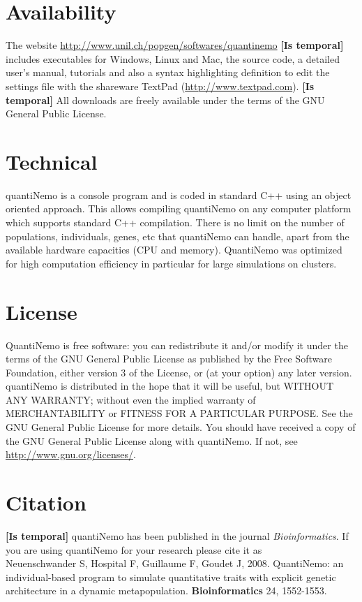 \documentclass[letterpaper,12pt,oneside]{book}
\newcommand{\tbc}[1]{\small {\bf \color{red} [Is temporal]} \normalsize} %
\begin{document}
\section{Availability}
The website \linebreak\url{http://www.unil.ch/popgen/softwares/quantinemo} \tbc{} includes executables for Windows, Linux and Mac, the source code, a detailed user's manual, tutorials and also a syntax highlighting definition to edit the settings file with the shareware TextPad (\linebreak\url{http://www.textpad.com}).  \tbc{} All downloads are freely available under the terms of the GNU General Public License.

\section{Technical}
quantiNemo is a console program and is coded in standard C++ using an object oriented approach. This allows compiling quantiNemo on any computer platform which supports standard C++ compilation. There is no limit on the number of populations, individuals, genes, etc that quantiNemo can handle, apart from the available hardware capacities (CPU and memory). QuantiNemo was optimized for high computation efficiency in particular for large simulations on clusters. 

\section{License}
QuantiNemo is free software: you can redistribute it and/or modify it under the terms of the GNU General Public License as published by the Free Software Foundation, either version 3 of the License, or (at your option) any later version. quantiNemo is distributed in the hope that it will be useful, but WITHOUT ANY WARRANTY; without even the implied warranty of MERCHANTABILITY or FITNESS FOR A PARTICULAR PURPOSE.  See the GNU General Public License for more details. You should have received a copy of the GNU General Public License along with quantiNemo. If not, see \linebreak\url{http://www.gnu.org/licenses/}.

\section{Citation}
\tbc{}
quantiNemo has been published in the journal \textit{Bioinformatics}. If you are using quantiNemo for your research please cite it as \\
 Neuenschwander S, Hospital F, Guillaume F, Goudet J, 2008. QuantiNemo: an individual-based program to simulate quantitative traits with explicit genetic architecture in a dynamic metapopulation. \textbf{Bioinformatics} 24, 1552-1553.
\end{document}

